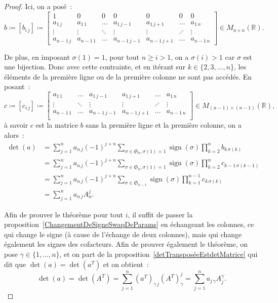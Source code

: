 \documentclass{article}
\DeclareMathOperator{\sign}{sign}
\newcommand{\R}{\mathbb R}
\newcommand{\M}[3]{M_{#1 \times #2}(#3)}
\newcommand{\Perm}{\mathfrak{S}}
\theoremstyle{definition}
\theoremstyle{remark}
\begin{document}
\begin{proof}
		Ici, on a posé~:
		\[b \coloneqq [b_{i\,j}] \coloneqq
			\begin{bmatrix}
				     1     &     0      &     0  &     0        &      0       &    0    &       0    \\
				a_{1\,j}   & a_{1\,1}   & \ldots & a_{1\,j-1}   & a_{1\,j+1}   & \ldots  & a_{1\,n}   \\
				  \vdots   &   \vdots   & \ddots &   \vdots     &   \vdots     & \iddots &   \vdots   \\
				a_{n-1\,j} & a_{n-1\,1} & \ldots & a_{n-1\,j-1} & a_{n-1\,j+1} & \ldots  & a_{n-1\,n}
			\end{bmatrix}
		\in \M nn\R.\]

		De plus, en imposant $\sigma(1) = 1$, pour tout $n \geq i > 1$, on a $\sigma(i) > 1$ car $\sigma$ est une bijection. Donc avec cette contrainte, et en
		itérant sur $k \in \{2, 3, \dotsc, n\}$, les éléments de la première ligne ou de la première colonne ne sont pas accédés. En posant~:
		\[c \coloneqq [c_{i\,j}] \coloneqq
			\begin{bmatrix}
				a_{1\,1}   & \ldots  & a_{1\,j-1}   & a_{1\,j+1}   & \ldots  & a_{1\,n}  \\
				  \vdots   & \ddots  &   \vdots     &   \vdots     & \iddots &   \vdots  \\
				a_{n-1\,1} & \ldots  & a_{n-1\,j-1} & a_{n-1\,j+1} & \ldots  & a_{n-1\,n} \\
			\end{bmatrix}
		\in \M {(n-1)}{(n-1)}\R,\]
		à savoir $c$ est la matrice $b$ sans la première ligne et la première colonne, on a alors~:
		\[\begin{aligned}
			\det(a) &= \sum_{j=1}^na_{n\,j}(-1)^{j+n}\sum_{\sigma\in\Perm_n, \sigma(1)=1}\sign(\sigma)\prod_{k=2}^nb_{k\,\sigma(k)} \\
			        &= \sum_{j=1}^na_{n\,j}(-1)^{j+n}\sum_{\sigma\in\Perm_n, \sigma(1)=1}\sign(\sigma)\prod_{k=2}^nc_{k-1\,\sigma(k-1)} \\
					&= \sum_{j=1}^na_{n\,j}(-1)^{j+n}\sum_{\sigma \in \Perm_{n-1}}\sign(\sigma)\prod_{k=1}^{n-1}c_{k\,\sigma(k)} \\
					&= \sum_{j=1}^na_{n\,j}A_n^j.
		\end{aligned}\]

		Afin de prouver le théorème pour tout $i$, il suffit de passer la proposition~\ref{ChangementDeSigneSwapDeParams} en échangeant les colonnes, ce qui change
		le signe (à cause de l'échange de deux colonnes), mais qui change également les signes des cofacteurs. Afin de prouver également le théorème,
		on pose $\gamma \in \{1, \dotsc, n\}$, et on part de la proposition~\ref{detTransposéeEstdetMatrice} qui dit que $\det(a) = \det(a^T)$ et on obtient~:
		\[\det(a) = \det(A^T) = \sum_{j=1}^n(a^T)_{\gamma\,j}(A^T)_\gamma^j = \sum_{j=1}^na_{j\,\gamma}A_j^\gamma.\] \end{proof}
\end{document}

